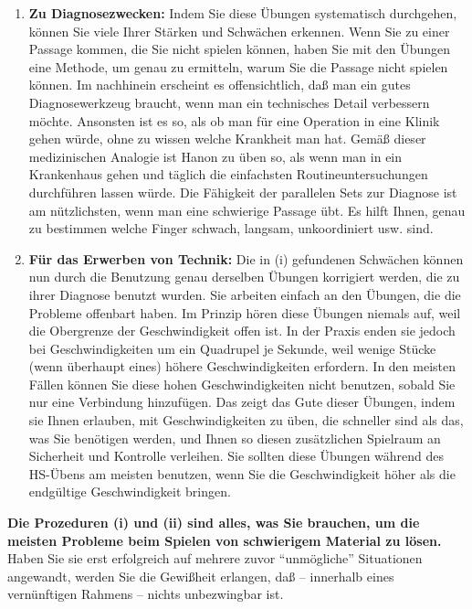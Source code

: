 \begin{enumerate}[label={\roman*.}] 
\item \textbf{Zu Diagnosezwecken:} Indem Sie diese Übungen systematisch durchgehen, können Sie viele Ihrer Stärken und Schwächen erkennen.
Wenn Sie zu einer Passage kommen, die Sie nicht spielen können, haben Sie mit den Übungen eine Methode, um genau zu ermitteln, warum Sie die Passage nicht spielen können.
Im nachhinein erscheint es offensichtlich, daß man ein gutes Diagnosewerkzeug braucht, wenn man ein technisches Detail verbessern möchte.
Ansonsten ist es so, als ob man für eine Operation in eine Klinik gehen würde, ohne zu wissen welche Krankheit man hat.
Gemäß dieser medizinischen Analogie ist Hanon zu üben so, als wenn man in ein Krankenhaus gehen und täglich die einfachsten Routineuntersuchungen durchführen lassen würde.
Die Fähigkeit der parallelen Sets zur Diagnose ist am nützlichsten, wenn man eine schwierige Passage übt.
Es hilft Ihnen, genau zu bestimmen welche Finger schwach, langsam, unkoordiniert usw. sind.

\item \textbf{Für das Erwerben von Technik:} Die in (i) gefundenen Schwächen können nun durch die Benutzung genau derselben Übungen korrigiert werden, die zu ihrer Diagnose benutzt wurden.
Sie arbeiten einfach an den Übungen, die die Probleme offenbart haben.
Im Prinzip hören diese Übungen niemals auf, weil die Obergrenze der Geschwindigkeit offen ist.
In der Praxis enden sie jedoch bei Geschwindigkeiten um ein Quadrupel je Sekunde, weil wenige Stücke (wenn überhaupt eines) höhere Geschwindigkeiten erfordern.
In den meisten Fällen können Sie diese hohen Geschwindigkeiten nicht benutzen, sobald Sie nur eine Verbindung hinzufügen.
Das zeigt das Gute dieser Übungen, indem sie Ihnen erlauben, mit Geschwindigkeiten zu üben, die schneller sind als das, was Sie benötigen werden, und Ihnen so diesen zusätzlichen Spielraum an Sicherheit und Kontrolle verleihen.
Sie sollten diese Übungen während des HS-Übens am meisten benutzen, wenn Sie die Geschwindigkeit höher als die endgültige Geschwindigkeit bringen.
\end{enumerate}

\textbf{Die Prozeduren (i) und (ii) sind alles, was Sie brauchen, um die meisten Probleme beim Spielen von schwierigem Material zu lösen.}
Haben Sie sie erst erfolgreich auf mehrere zuvor \enquote{unmögliche} Situationen angewandt, werden Sie die Gewißheit erlangen, daß -- innerhalb eines vernünftigen Rahmens -- nichts unbezwingbar ist.

